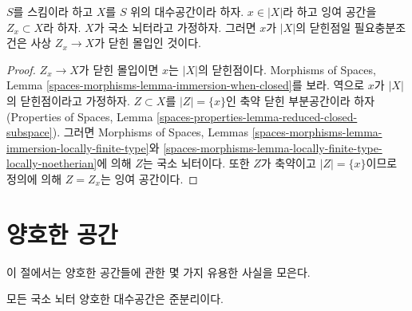 \begin{lemma}
\label{lemma-residual-space-closed}
$S$를 스킴이라 하고 $X$를 $S$ 위의 대수공간이라 하자.
$x \in |X|$라 하고 잉여 공간을 $Z_x \subset X$라 하자. $X$가 국소
뇌터라고 가정하자. 그러면 $x$가 $|X|$의 닫힌점일 필요충분조건은
사상 $Z_x \to X$가 닫힌 몰입인 것이다.
\end{lemma}

\begin{proof}
$Z_x \to X$가 닫힌 몰입이면 $x$는 $|X|$의 닫힌점이다. Morphisms of
Spaces, Lemma \ref{spaces-morphisms-lemma-immersion-when-closed}를 보라.
역으로 $x$가 $|X|$의 닫힌점이라고 가정하자.
$Z \subset X$를 $|Z| = \{x\}$인 축약 닫힌 부분공간이라 하자
(Properties of Spaces, Lemma
\ref{spaces-properties-lemma-reduced-closed-subspace}). 그러면
Morphisms of Spaces, Lemmas
\ref{spaces-morphisms-lemma-immersion-locally-finite-type}와
\ref{spaces-morphisms-lemma-locally-finite-type-locally-noetherian}에 의해
$Z$는 국소 뇌터이다. 또한 $Z$가 축약이고 $|Z| = \{x\}$이므로
정의에 의해 $Z = Z_x$는 잉여 공간이다.
\end{proof}






\section{양호한 공간}
\label{section-decent}

\noindent
이 절에서는 양호한 공간들에 관한 몇 가지 유용한 사실을 모은다.

\begin{lemma}
\label{lemma-locally-Noetherian-decent-quasi-separated}
모든 국소 뇌터 양호한 대수공간은 준분리이다.
\end{lemma}

